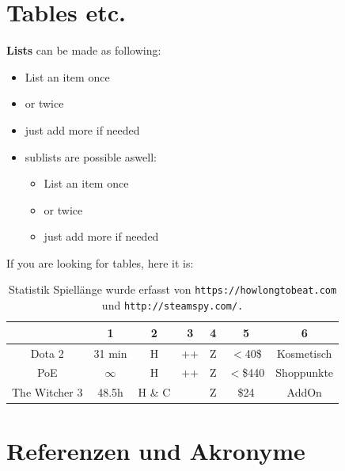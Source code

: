 \documentclass[10pt,a4paper]{article}
\begin{document}
\section{Tables etc.}

\textbf{Lists} can be made as following:
\begin{itemize}
\item List an item once
\item or twice
\item just add more if needed
\item sublists are possible aswell:
\begin{itemize}
\item List an item once
\item or twice
\item just add more if needed
\end{itemize}
\end{itemize}

If you are looking for tables, here it is:
\begin{table}[H]
\centering
\begin{tabular}{ |c|c|c|c|c|c|c| }
\hline
 & 1 & 2 & 3 & 4 & 5 & 6 \\
\hline
Dota 2 & 31 min & H & ++ & Z & $<$40\$ & Kosmetisch \\
\hline
PoE & $\infty$ & H & ++ & Z & $<$\$440 & Shoppunkte \\
\hline
The Witcher 3 & 48.5h & H \& C &  & Z & \$24 & AddOn \\
\hline
\end{tabular}
\caption{Statistik Spiellänge wurde erfasst von \texttt{https://howlongtobeat.com} und \texttt{http://steamspy.com/.}}
\label{table:1}
\end{table}

\section{Referenzen und Akronyme}

\printglossaries


%
%

%


\listoffigures
\listoftables

\end{document}
